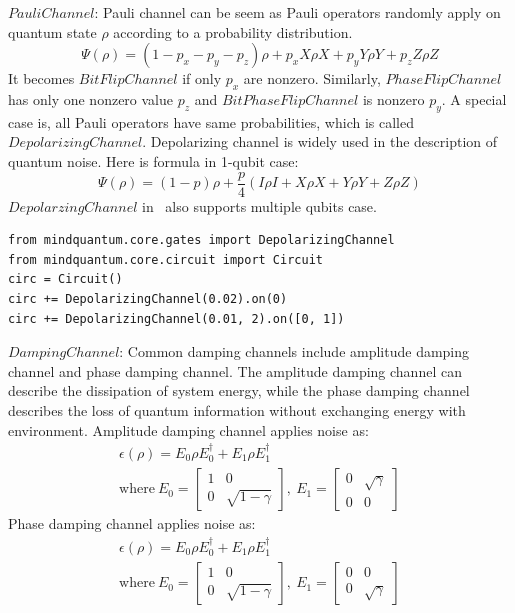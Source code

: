 $Pauli Channel$: Pauli channel can be seem as Pauli operators randomly apply on quantum state $\rho$ according to a probability distribution.
\begin{equation}
    \Psi(\rho) = (1-p_x-p_y-p_z) \rho + p_x X \rho X + p_y Y \rho Y + p_z Z \rho Z
\end{equation}
It becomes $BitFlipChannel$ if only $p_x$ are nonzero. Similarly, $PhaseFlipChannel$ has only one nonzero value $p_z$ and $BitPhaseFlipChannel$ is nonzero $p_y$. A special case is, all Pauli operators have same probabilities, which is called $DepolarizingChannel$. Depolarizing channel is widely used in the description of quantum noise. Here is formula in 1-qubit case:
\begin{equation}
    \Psi(\rho) =  (1-p) \rho + \frac{p}{4}(I\rho I+X\rho X+Y\rho Y+Z\rho Z)
\end{equation}
$Depolarzing Channel$ in \MindQuantum\ also supports multiple qubits case.
\begin{lstlisting}
from mindquantum.core.gates import DepolarizingChannel
from mindquantum.core.circuit import Circuit
circ = Circuit()
circ += DepolarizingChannel(0.02).on(0)
circ += DepolarizingChannel(0.01, 2).on([0, 1])
\end{lstlisting}
$Damping Channel$: Common damping channels include amplitude damping channel and phase damping channel. The amplitude damping channel can describe the dissipation of system energy, while the phase damping channel describes the loss of quantum information without exchanging energy with environment.
Amplitude damping channel applies noise as:
\begin{gather*}
    \epsilon(\rho) = E_0 \rho E_0^\dagger + E_1 \rho E_1^\dagger
    \\
    \text{where}\ {E_0}=\begin{bmatrix}1 & 0               \\
               0 & \sqrt{1-\gamma}\end{bmatrix},
    \ {E_1}=\begin{bmatrix}0 & \sqrt{\gamma} \\
               0 & 0\end{bmatrix}
\end{gather*}
Phase damping channel applies noise as:
\begin{gather*}
    \epsilon(\rho) = E_0 \rho E_0^\dagger + E_1 \rho E_1^\dagger
    \\
    \text{where}\ {E_0}=\begin{bmatrix}1 & 0               \\
               0 & \sqrt{1-\gamma}\end{bmatrix},
    \ {E_1}=\begin{bmatrix}0 & 0             \\
               0 & \sqrt{\gamma}\end{bmatrix}
\end{gather*}
